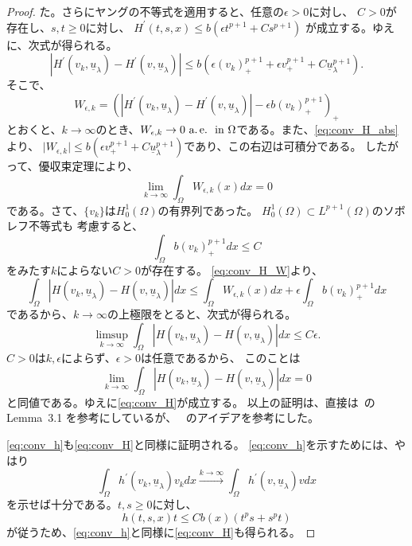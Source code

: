 \begin{proof}
 た。さらにヤングの不等式を適用すると、任意の$\epsilon > 0$に対し、
 $C > 0$が存在し、$s, t \geq 0$に対し、
 $H^\prime(t, s, x) \leq b( \epsilon t^{p+1} + C s^{p+1})$
 が成立する。ゆえに、次式が得られる。
 \begin{equation}
  \left\lvert H^\prime(v_k, \underline{u}_\lambda) - H^\prime(v,
   \underline{u}_\lambda ) \right\rvert \leq b \left( \epsilon
   (v_k)_+^{p+1}  + \epsilon v_+^{p+1} + C
   \underline{u}_\lambda^{p+1} \right). \label{eq:conv_H_abs}
 \end{equation}
 そこで、
 \begin{equation}
  W_{\epsilon, k} = \left( \left\lvert H^\prime(v_k,
                            \underline{u}_\lambda) - H^\prime(v,
                            \underline{u}_\lambda) \right\rvert
  -\epsilon b (v_k)_+^{p+1}
                    \right)_+ \label{eq:conv_H_W}
 \end{equation}
 とおくと、$k \to \infty$のとき、$W_{\epsilon, k} \to 0 ~\text{a.\,e.}~ ~\text{in}~
 \Omega$である。また、\eqref{eq:conv_H_abs}より、
 $\lvert W_{\epsilon, k} \rvert \leq b \left( \epsilon v_+^{p+1} + C
 \underline{u}_\lambda^{p+1} \right)$であり、この右辺は可積分である。
 したがって、優収束定理により、
 \[
  \lim_{k \to \infty} \int_\Omega  W_{\epsilon, k}(x) dx = 0
 \]
 である。さて、$\{v_k \}$は$H_0^1(\Omega)$の有界列であった。
 $H_0^1(\Omega) \subset L^{p+1}(\Omega)$のソボレフ不等式も
 考慮すると、
 \[
   \int_\Omega b ( v_k )_+^{p+1} dx \leq C
 \]
 をみたす$k$によらない$C > 0$が存在する。
 \eqref{eq:conv_H_W}より、
 \[
  \int_\Omega \left\lvert H(v_k, \underline{u}_\lambda) - H(v,
 \underline{u}_\lambda ) \right\rvert dx \leq \int_\Omega W_{\epsilon,
 k} (x)dx + \epsilon \int_\Omega b(v_k)_+^{p+1} dx
 \]
 であるから、$k \to \infty$の上極限をとると、次式が得られる。
 \[
 \limsup_{k \to \infty} \int_\Omega 
 \left\lvert H(v_k, \underline{u}_\lambda) - H(v,
 \underline{u}_\lambda ) \right\rvert dx \leq C \epsilon.
 \]
 $C > 0$は$k, \epsilon$によらず、$\epsilon > 0$は任意であるから、
 このことは
 \[
  \lim_{k \to \infty}
 \int_\Omega \left\lvert H(v_k, \underline{u}_\lambda) - H(v,
 \underline{u}_\lambda ) \right\rvert dx = 0
 \]
 と同値である。ゆえに\eqref{eq:conv_H}が成立する。
 以上の証明は、直接は~\cite{MR2886160}の Lemma~3.1 を参考にしているが、
 ~\cite{MR699419}のアイデアを参考にした。
 
 \eqref{eq:conv_h}も\eqref{eq:conv_H}と同様に証明される。
 \eqref{eq:conv_h}を示すためには、やはり
 \[
  \int_\Omega h^\prime(v_k, \underline{u}_\lambda) v_k dx
 \xrightarrow{k \to \infty} \int_\Omega h^\prime (v,
 \underline{u}_\lambda ) v dx 
 \]
 を示せば十分である。$t, s \geq 0$に対し、
 \[
  h(t, s, x) t \leq C b(x) (t^p s + s^p t)
 \]
 が従うため、\eqref{eq:conv_h}と同様に\eqref{eq:conv_H}も得られる。
 

\end{proof}
